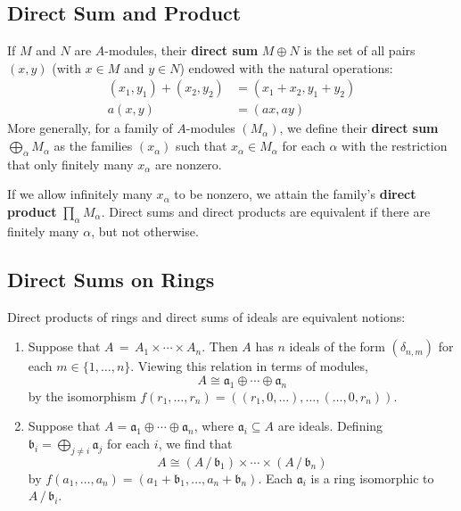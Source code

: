 \documentclass[11pt]{article}
\begin{document}

\subsection{Direct Sum and Product}

If $M$ and $N$ are $A$-modules, their \textbf{direct sum} $M \oplus N$ is the set of all pairs $(x, y)$ (with $x \in M$ and $y \in N$) endowed with the natural operations:
\begin{align*}
	(x_{1}, y_{1}) + (x_{2}, y_{2}) & = (x_{1} + x_{2}, y_{1} + y_{2}) \\
	                        a(x, y) & = (ax, ay)
\end{align*}
More generally, for a family of $A$-modules $(M_{\alpha})$, we define their \textbf{direct sum} $\bigoplus_{\alpha} M_{\alpha}$ as the families $(x_{\alpha})$ such that $x_{\alpha} \in M_{\alpha}$ for each $\alpha$ with the restriction that only finitely many $x_{\alpha}$ are nonzero.

If we allow infinitely many $x_{\alpha}$ to be nonzero, we attain the family's \textbf{direct product} $\prod_{\alpha} M_{\alpha}$. Direct sums and direct products are equivalent if there are finitely many $\alpha$, but not otherwise.

\newpage

\subsection{Direct Sums on Rings}

Direct products of rings and direct sums of ideals are equivalent notions:
\begin{enumerate}
  \item Suppose that $A \, = \, A_{1} \times \cdots \times A_{n}$. Then $A$ has $n$ ideals of the form $(\delta_{n, m})$ for each $m \in \{ 1, \ldots, n \}$. Viewing this relation in terms of modules,
  \[
  	A \cong \mathfrak{a}_{1} \oplus \cdots \oplus \mathfrak{a}_{n}
  \]
  by the isomorphism $f(r_{1}, \ldots, r_{n}) = ((r_{1}, 0, \ldots), \ldots, (\ldots, 0, r_{n}))$.
  \item Suppose that $A = \mathfrak{a}_{1} \oplus \cdots \oplus \mathfrak{a}_{n}$, where $\mathfrak{a}_{i} \subseteq A$ are ideals. Defining $\mathfrak{b}_{i} = \bigoplus_{j \ne i} \mathfrak{a}_{j}$ for each $i$, we find that
  \[
	  A \cong (A \,/\, \mathfrak{b}_{1}) \times \cdots \times (A \,/\, \mathfrak{b}_{n})
  \]
  by $f(a_{1}, \ldots, a_{n}) = (a_{1} + \mathfrak{b}_{1}, \ldots, a_{n} + \mathfrak{b}_{n})$. Each $\mathfrak{a}_{i}$ is a ring isomorphic to $A \, / \, \mathfrak{b}_{i}$.
\end{enumerate}
\end{document}

